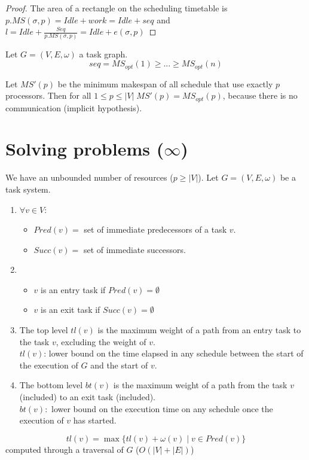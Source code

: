 \begin{proof}
The area of a rectangle on the scheduling timetable is $p.MS(\sigma, p)=Idle+work=Idle+seq$ and $l=Idle + \frac{Seq}{p.MS(\sigma,p)}=Idle+e(\sigma,p)$
\end{proof}

\begin{thm}
Let $G=(V,E,\omega)$ a task graph.
\[seq=MS_{opt}(1)\geq ... \geq MS_{opt}(n)\]
\end{thm}

Let $MS'(p)$ be the minimum makespan of all schedule that use exactly $p$ processors. Then for all $1\leq p \leq |V| \; MS'(p)=MS_{opt}(p)$, because there is no communication (implicit hypothesis).



\section{Solving problems ($\infty$)}
We have an unbounded number of resources ($p\geq |V|$). Let $G=(V,E,\omega)$ be a task system.

\begin{defi}
\begin{enumerate}
\item 
$\forall v \in V$:
\begin{itemize}
\item $Pred (v)=$ set of immediate predecessors of a task $v$.
\item $Succ(v)=$ set of immediate successors.
\end{itemize}

\item 

\begin{itemize}
\item $v$ is an entry task if $Pred(v)=\emptyset$
\item $v$ is an exit task if $Succ(v)=\emptyset$
\end{itemize}

\item The top level $tl(v)$ is the maximum weight of a path from an entry task to the task $v$, excluding the weight of $v$.\\
$tl(v)$: lower bound on the time elapsed in any schedule between the start of the execution of $G$ and the start of $v$.

\item The bottom level $bt(v)$ is the maximum weight of a path from the task $v$ (included) to an exit task (included).\\
$bt(v):$ lower bound on the execution time on any schedule once the execution of $v$ has started.
\end{enumerate}

\[tl(v) = \max \{ tl(v) + \omega (v) \; | \; v \in Pred(v) \}\]
computed through a traversal of $G$ ($O(|V|+|E|)$)
\end{defi}

